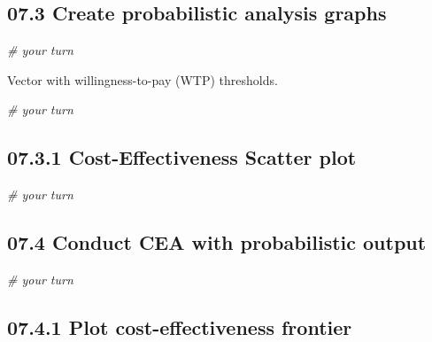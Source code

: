 \documentclass[
]{article}
\newenvironment{Shaded}{\begin{snugshade}}{\end{snugshade}}
\newcommand{\CommentTok}[1]{\textcolor[rgb]{0.56,0.35,0.01}{\textit{#1}}}
\begin{document}
\hypertarget{create-probabilistic-analysis-graphs}{%
\subsection{07.3 Create probabilistic analysis
graphs}\label{create-probabilistic-analysis-graphs}}

\begin{Shaded}
\begin{Highlighting}[]
\CommentTok{# your turn}
\end{Highlighting}
\end{Shaded}

Vector with willingness-to-pay (WTP) thresholds.

\begin{Shaded}
\begin{Highlighting}[]
\CommentTok{# your turn}
\end{Highlighting}
\end{Shaded}

\hypertarget{cost-effectiveness-scatter-plot}{%
\subsection{07.3.1 Cost-Effectiveness Scatter
plot}\label{cost-effectiveness-scatter-plot}}

\begin{Shaded}
\begin{Highlighting}[]
\CommentTok{# your turn}
\end{Highlighting}
\end{Shaded}

\hypertarget{conduct-cea-with-probabilistic-output}{%
\subsection{07.4 Conduct CEA with probabilistic
output}\label{conduct-cea-with-probabilistic-output}}

\begin{Shaded}
\begin{Highlighting}[]
\CommentTok{# your turn}
\end{Highlighting}
\end{Shaded}

\hypertarget{plot-cost-effectiveness-frontier}{%
\subsection{07.4.1 Plot cost-effectiveness
frontier}\label{plot-cost-effectiveness-frontier}}
\end{document}
